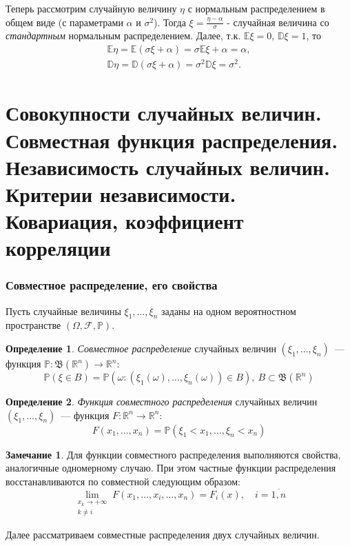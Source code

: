 \documentclass[oneside,final,14pt]{extreport}
\theoremstyle{plain}
\theoremstyle{definition}
\newtheorem*{defn}{Определение}
\newtheorem*{rmrk}{Замечание}
\theoremstyle{named}
\begin{document}
Теперь рассмотрим случайную величину $\eta$ с нормальным распределением в общем виде (с параметрами $\alpha$ и $\sigma^2$). Тогда $\xi = \frac{\eta - \alpha}{\sigma}$ - случайная величина со {\it стандартным} нормальным распределением. Далее, т.к. $\mathbb{E}\xi = 0$, $\mathbb{D}\xi = 1$, то 
\begin{gather*}
    \mathbb{E}\eta = \mathbb{E}(\sigma \xi + \alpha) = \sigma \mathbb{E} \xi + \alpha = \alpha, \\
    \mathbb{D}\eta = \mathbb{D}(\sigma \xi + \alpha) = \sigma^2 \mathbb{D}\xi = \sigma^2.
\end{gather*}

\section{Совокупности случайных величин. Совместная функция распределения. Независимость случайных величин. Критерии независимости. Ковариация, коэффициент корреляции}

\subsubsection{Совместное распределение, его свойства}

Пусть случайные величины $\xi_1, \ldots, \xi_n$ заданы на одном вероятностном пространстве $(\Omega, \mathcal{F}, \mathbb{P})$.
\begin{defn}
    {\it Совместное распределение} случайных величин $(\xi_1, \ldots, \xi_n)$~--- функция $\mathbb{P}: \mathfrak{B}(\mathbb{R}^{n}) \to \mathbb{R}^{n}$:
    \begin{equation*}
        \mathbb{P}(\xi \in B) = \mathbb{P}(\omega \colon (\xi_{1}(\omega), \ldots, \xi_{n}(\omega)) \in B),~ B \subset \mathfrak{B}(\mathbb{R}^{n})
    \end{equation*}
\end{defn}
\begin{defn}
    {\it Функция совместного распределения} случайных величин $(\xi_1, \ldots, \xi_n)$~--- функция $F: \mathbb{R}^{n} \to \mathbb{R}^{n}$:
    \begin{equation*}
        F(x_{1}, \ldots, x_{n})=\mathbb{P}(\xi_{1}<x_{1}, \ldots, \xi_{n}<x_{n})
    \end{equation*}
\end{defn}

\begin{rmrk}
    Для функции совместного распределения выполняются свойства, аналогичные одномерному случаю. При этом частные функции распределения восстанавливаются по совместной следующим образом:
    \begin{equation*}
        \lim_{\substack{x_{k} \to +\infty \\ k \neq i}}  F(x_{1}, \ldots, x_{i}, \ldots, x_{n}) = F_{i}(x), \quad i = \overline{1,n}
    \end{equation*}
\end{rmrk}
Далее рассматриваем совместные распределения двух случайных величин.
\end{document}
